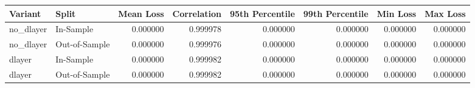 \begin{tabular}{llrrrrrr}
\toprule
Variant & Split & Mean Loss & Correlation & 95th Percentile & 99th Percentile & Min Loss & Max Loss \\
\midrule
no_dlayer & In-Sample & 0.000000 & 0.999978 & 0.000000 & 0.000000 & 0.000000 & 0.000000 \\
no_dlayer & Out-of-Sample & 0.000000 & 0.999976 & 0.000000 & 0.000000 & 0.000000 & 0.000000 \\
dlayer & In-Sample & 0.000000 & 0.999982 & 0.000000 & 0.000000 & 0.000000 & 0.000000 \\
dlayer & Out-of-Sample & 0.000000 & 0.999982 & 0.000000 & 0.000000 & 0.000000 & 0.000000 \\
\bottomrule
\end{tabular}
